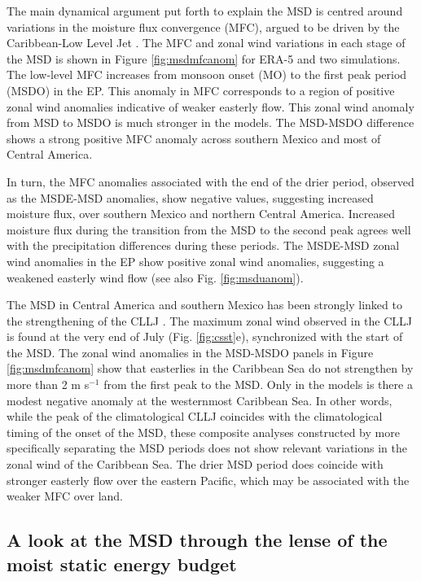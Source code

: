 The main dynamical argument put forth to explain the MSD is centred around variations in the moisture flux convergence (MFC), argued to be driven by the Caribbean-Low Level Jet \citep[see e.g.][]{gamble2008,herrera2015,martinez2019}. The MFC and zonal wind variations in each stage of the MSD is shown in Figure \ref{fig:msdmfcanom} for ERA-5 and two simulations. The low-level MFC increases from monsoon onset (MO) to the first peak period (MSDO) in the EP. This anomaly in MFC corresponds to a region of positive zonal wind anomalies indicative of weaker easterly flow.
 This zonal wind anomaly from MSD to MSDO is much stronger in the models.  
The MSD-MSDO difference shows a strong positive MFC anomaly across southern Mexico and most of Central America. 

In turn, the MFC anomalies associated with the end of the drier period, observed as the MSDE-MSD anomalies,  show negative values, suggesting increased moisture flux, over southern Mexico and northern Central America.
Increased moisture flux during the transition from the MSD to the second peak agrees well with the precipitation differences during these periods.  The MSDE-MSD zonal wind anomalies in the EP show positive zonal wind anomalies, suggesting a weakened easterly wind flow (see also Fig. \ref{fig:msduanom}). 

The MSD in Central America and southern Mexico has been strongly linked to the strengthening of the CLLJ \citep{herrera2015}. The maximum zonal wind observed in the CLLJ is found at the very end of July (Fig. \ref{fig:csst}e), synchronized with the start of the MSD. 
The zonal wind anomalies in the MSD-MSDO panels in Figure \ref{fig:msdmfcanom} show that easterlies in the Caribbean Sea do not strengthen by more than 2 m s$^{-1}$ from the first peak to the MSD. Only in the models is there a modest negative anomaly at the westernmost Caribbean Sea. In other words, while the peak of the climatological CLLJ coincides with the climatological timing of the onset of the MSD, these composite analyses constructed by more specifically separating the MSD periods does not show relevant variations in the zonal wind of the Caribbean Sea. 
The drier MSD period does coincide with stronger easterly flow over the eastern Pacific, which may be associated with the weaker MFC over land. %

\subsection{A look at the MSD through the lense of the moist static energy budget}

